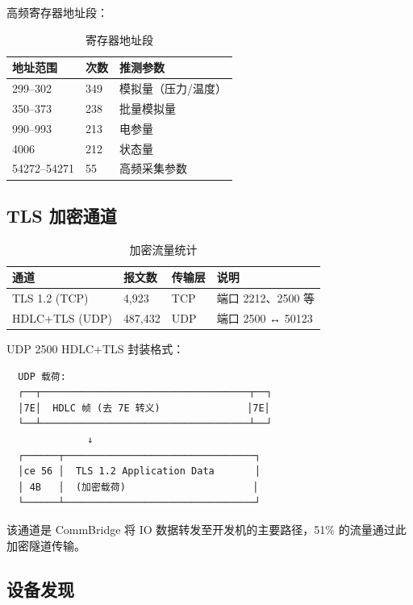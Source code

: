 \documentclass[12pt,a4paper]{ctexart}
\begin{document}
高频寄存器地址段：

\begin{table}[H]\centering
\caption{寄存器地址段}
\begin{tabular}{p{3cm} p{2cm} p{6cm}}
\toprule
\textbf{地址范围} & \textbf{次数} & \textbf{推测参数} \\
\midrule
299--302 & 349 & 模拟量（压力/温度） \\
350--373 & 238 & 批量模拟量 \\
990--993 & 213 & 电参量 \\
4006 & 212 & 状态量 \\
54272--54271 & 55 & 高频采集参数 \\
\bottomrule
\end{tabular}
\end{table}

\subsection{TLS 加密通道}

\begin{table}[H]\centering
\caption{加密流量统计}
\begin{tabular}{p{3cm} p{2cm} p{2cm} p{5cm}}
\toprule
\textbf{通道} & \textbf{报文数} & \textbf{传输层} & \textbf{说明} \\
\midrule
TLS 1.2 (TCP) & 4,923 & TCP & 端口 2212、2500 等 \\
HDLC+TLS (UDP) & 487,432 & UDP & 端口 2500 ↔ 50123 \\
\bottomrule
\end{tabular}
\end{table}

UDP 2500 HDLC+TLS 封装格式：

\begin{verbatim}
  UDP 载荷:
  ┌──┬────────────────────────────────────┬──┐
  │7E│  HDLC 帧 (去 7E 转义)               │7E│
  └──┴────────────────────────────────────┴──┘
              ↓
  ┌──────┬─────────────────────────────────┐
  │ce 56 │  TLS 1.2 Application Data       │
  │ 4B   │  (加密载荷)                      │
  └──────┴─────────────────────────────────┘
\end{verbatim}

该通道是 CommBridge 将 IO 数据转发至开发机的主要路径，51\% 的流量通过此加密隧道传输。

\subsection{设备发现}
\end{document}
